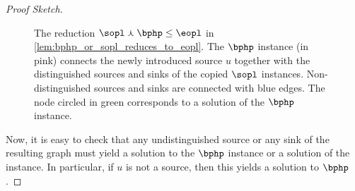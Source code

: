 \begin{proof}[Proof Sketch]
\begin{figure}[th]
\caption{The reduction $\sopl\curlywedge\bphp\leq\eopl$ in \cref{lem:bphp_or_sopl_reduces_to_eopl}. The $\bphp$ instance (in pink) connects the newly introduced source $u$ together with the distinguished sources and sinks of the copied $\sopl$ instances. Non-distinguished sources and sinks are connected with blue edges. The node circled in green corresponds to a solution of the $\bphp$ instance.}
\label{figure:reduction_php_or_sopl_eopl}
\end{figure}

Now, it is easy to check that any undistinguished source or any sink of the resulting graph must yield a solution to the $\bphp$ instance or a solution of the \sopl instance. In particular, if $u$ is not a source, then this yields a solution to $\bphp$.
\end{proof}

